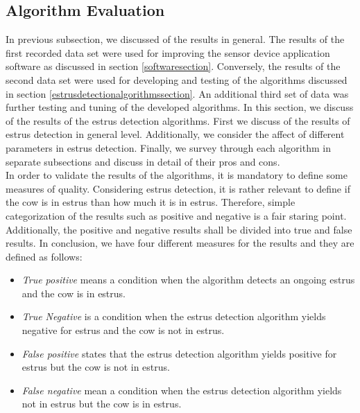 \documentclass[english,12pt,a4paper,pdftex,elec,utf8]{aaltothesis}
\begin{document}
\subsection{Algorithm Evaluation} \label{algorithmevaluationsection}

In previous subsection, we discussed of the results in general. The results of the first recorded data set were used for improving the sensor device application software as discussed in section \ref{softwaresection}. Conversely, the results of the second data set were used for developing and testing of the algorithms discussed in section \ref{estrusdetectionalgorithmssection}. An additional third set of data was further testing and tuning of the developed algorithms. In this section, we discuss of the results of the estrus detection algorithms. First we discuss of the results of estrus detection in general level. Additionally, we consider the affect of different parameters in estrus detection. Finally, we survey through each algorithm in separate subsections and discuss in detail of their pros and cons. \\
In order to validate the results of the algorithms, it is mandatory to define some measures of quality. Considering estrus detection, it is rather relevant to define if the cow is in estrus than how much it is in estrus. Therefore, simple categorization of the results such as positive and negative is a fair staring point. Additionally, the positive and negative results shall be divided into true and false results. In conclusion, we have four different measures for the results and they are defined as follows:


\begin{itemize}
\item \textit{True positive} means a condition when the algorithm detects an ongoing estrus and the cow is in estrus.
\item \textit{True Negative} is a condition when the estrus detection algorithm yields negative for estrus and the cow is not in estrus.
\item \textit{False positive} states that the estrus detection algorithm yields positive for estrus but the cow is not in estrus.
\item \textit{False negative} mean a condition when the estrus detection algorithm yields not in estrus but the cow is in estrus.
\end{itemize}
\end{document}

